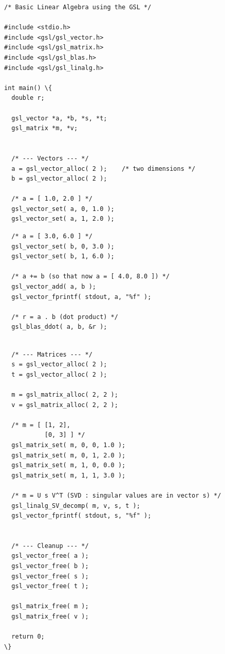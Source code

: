\begin{verbatim}
/* Basic Linear Algebra using the GSL */

#include <stdio.h>
#include <gsl/gsl_vector.h>
#include <gsl/gsl_matrix.h>
#include <gsl/gsl_blas.h>
#include <gsl/gsl_linalg.h>

int main() \{
  double r;

  gsl_vector *a, *b, *s, *t;
  gsl_matrix *m, *v;


  /* --- Vectors --- */
  a = gsl_vector_alloc( 2 );    /* two dimensions */
  b = gsl_vector_alloc( 2 );

  /* a = [ 1.0, 2.0 ] */
  gsl_vector_set( a, 0, 1.0 ); 
  gsl_vector_set( a, 1, 2.0 );

\end{verbatim}
\begin{verbatim}
  /* a = [ 3.0, 6.0 ] */
  gsl_vector_set( b, 0, 3.0 );
  gsl_vector_set( b, 1, 6.0 );
 
  /* a += b (so that now a = [ 4.0, 8.0 ]) */
  gsl_vector_add( a, b );
  gsl_vector_fprintf( stdout, a, "%f" );

  /* r = a . b (dot product) */
  gsl_blas_ddot( a, b, &r );
\end{verbatim}\vspace*{-6pt}
\makeatletter
\def\texttt#1{{\fontsize{8}{10}\ttfamily\selectfont#1}}
\makeatother
\hspace*{26pt}\texttt{fprintf( stdout, "\%f$\backslash$n", r );}\vspace*{-6pt}
\begin{verbatim}

  /* --- Matrices --- */
  s = gsl_vector_alloc( 2 );
  t = gsl_vector_alloc( 2 ); 

  m = gsl_matrix_alloc( 2, 2 );
  v = gsl_matrix_alloc( 2, 2 );

  /* m = [ [1, 2], 
           [0, 3] ] */
  gsl_matrix_set( m, 0, 0, 1.0 );
  gsl_matrix_set( m, 0, 1, 2.0 );
  gsl_matrix_set( m, 1, 0, 0.0 );
  gsl_matrix_set( m, 1, 1, 3.0 );

  /* m = U s V^T (SVD : singular values are in vector s) */
  gsl_linalg_SV_decomp( m, v, s, t );
  gsl_vector_fprintf( stdout, s, "%f" );


  /* --- Cleanup --- */
  gsl_vector_free( a );
  gsl_vector_free( b );
  gsl_vector_free( s );
  gsl_vector_free( t );

  gsl_matrix_free( m );
  gsl_matrix_free( v );

  return 0;
\}
\end{verbatim}


